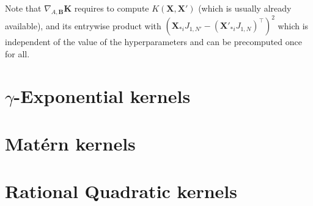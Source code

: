 \documentclass[a4paper,11pt]{article}
\newcommand\X{{\mathbf X}}
\newcommand\K{{\mathbf K}}
\begin{document}
Note that $\nabla_{A,\mathbf{B}} \K$ requires to compute $K(\X,\X')$
(which is usually already available), and its entrywise product with
$(\X_{*i}J_{1,N'}- (\X'_{*i}J_{1,N})^{\top})^2$ which is independent
of the value of the hyperparameters and can be precomputed once for
all.

\section{$\gamma$-Exponential kernels}

\section{Mat\'ern kernels}

\section{Rational Quadratic kernels}
\end{document}
